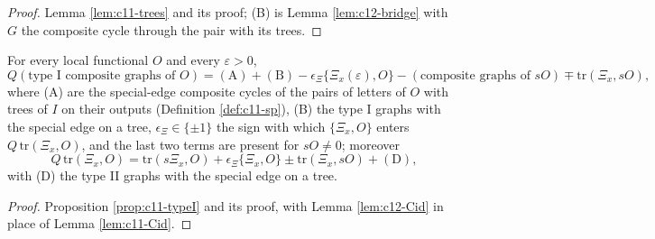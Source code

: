 \begin{proof}
Lemma \ref{lem:c11-trees} and its proof; (B) is Lemma \ref{lem:c12-bridge} with $G$ the composite cycle through the pair with its trees.
\end{proof}

\begin{proposition}
\label{prop:c12-typeI}
For every local functional $O$ and every $\varepsilon>0$,
\[
Q(\text{type I composite graphs of }O)=(\mathrm A)+(\mathrm B)-\epsilon_\Xi\{\Xi_x(\varepsilon),O\}-(\text{composite graphs of }sO)\mp\mathrm{tr}(\Xi_x,sO),
\]
where (A) are the special-edge composite cycles of the pairs of letters of $O$ with trees of $I$ on their outputs (Definition \ref{def:c11-sp}), (B) the type I graphs with the special edge on a tree, $\epsilon_\Xi\in\{\pm1\}$ the sign with which $\{\Xi_x,O\}$ enters $Q\,\mathrm{tr}(\Xi_x,O)$, and the last two terms are present for $sO\neq0$; moreover
\[
Q\,\mathrm{tr}(\Xi_x,O)=\mathrm{tr}(s\Xi_x,O)+\epsilon_\Xi\{\Xi_x,O\}\pm\mathrm{tr}(\Xi_x,sO)+(\mathrm D),
\]
with (D) the type II graphs with the special edge on a tree.
\end{proposition}

\begin{proof}
Proposition \ref{prop:c11-typeI} and its proof, with Lemma \ref{lem:c12-Cid} in place of Lemma \ref{lem:c11-Cid}.
\end{proof}

